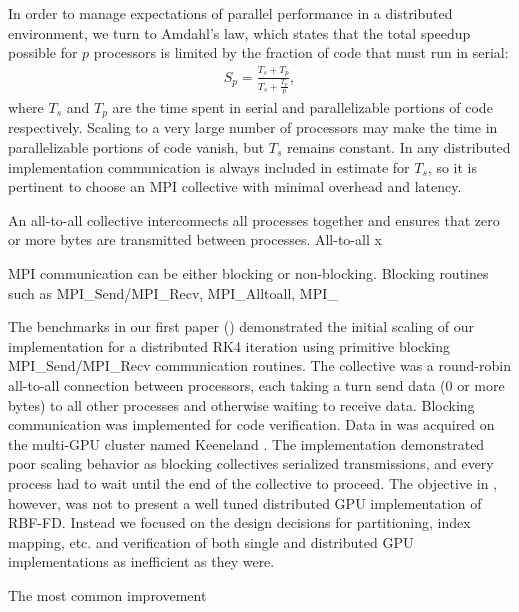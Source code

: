 \documentclass{report}
\begin{document}
In order to manage expectations of parallel performance in a distributed environment, we turn to Amdahl's law, which states that the total speedup possible for $p$ processors is limited by the fraction of code that must run in serial:
\begin{align}
S_p = \frac{T_s + T_p}{T_s + \frac{T_p}{p}},  \nonumber
\end{align}
where $T_s$ and $T_p$ are the time spent in serial and parallelizable portions of code respectively. Scaling to a very large number of processors may make the time in parallelizable portions of code vanish, but $T_s$ remains constant. In any distributed implementation communication is always included in estimate for $T_s$, so it is pertinent to choose an MPI collective with minimal overhead and latency. 

An all-to-all collective interconnects all processes together and ensures that zero or more bytes are transmitted between processes. All-to-all x

MPI communication can be either blocking or non-blocking. Blocking routines such as MPI\_Send/MPI\_Recv, MPI\_Alltoall, MPI\_




The benchmarks in our first paper (\cite{BolligFlyerErlebacher2012}) demonstrated the initial scaling of our implementation for a distributed RK4 iteration using primitive blocking MPI\_Send/MPI\_Recv communication routines. The collective was a round-robin all-to-all connection between processors, each taking a turn send data (0 or more bytes) to all other processes and otherwise waiting to receive data. Blocking communication was implemented for code verification. Data in \cite{BolligFlyerErlebacher2012} was acquired on the multi-GPU cluster named Keeneland \cite{Vetter2011}. The implementation demonstrated poor scaling behavior as blocking collectives serialized transmissions, and every process had to wait until the end of the collective to proceed. The objective in \cite{BolligFlyerErlebacher2012}, however, was not to present a well tuned distributed GPU implementation of RBF-FD. Instead we focused on the design decisions for partitioning, index mapping, etc. and verification of both single and distributed GPU implementations as inefficient as they were. 

The most common improvement 


\end{document}
